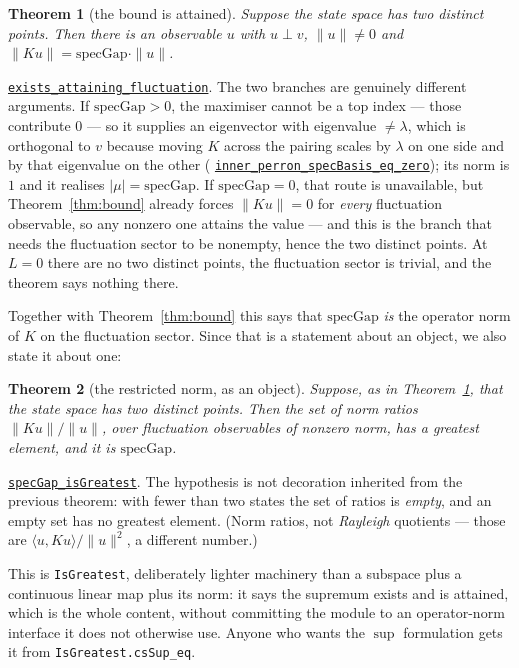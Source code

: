 \documentclass[11pt]{article}
\newtheorem{theorem}{Theorem}[section]
\theoremstyle{definition}
\newcommand{\anchor}{9704b3f3c0d576bb40c43caa5360fbd64dfa1643}
\newcommand{\osline}[3]{%
  \href{https://github.com/lluiseriksson/THE-ERIKSSON-PROGRAMME/blob/\anchor/YangMills/OS/#1.lean\#L#2}{\nolinkurl{#3}}}
\begin{document}
\begin{theorem}[the bound is attained]\label{thm:sharp}
Suppose the state space has two distinct points.  Then there is an observable
$u$ with $u \perp v$, $\|u\| \ne 0$ and
$\|Ku\| = \mathrm{specGap}\cdot\|u\|$.
\end{theorem}

\osline{SpatialSpectral}{886}{exists\_attaining\_fluctuation}.
The two branches are genuinely different arguments.  If
$\mathrm{specGap}>0$, the maximiser cannot be a top index --- those contribute
$0$ --- so it supplies an eigenvector with eigenvalue $\ne\lambda$, which is
orthogonal to $v$ because moving $K$ across the pairing scales by $\lambda$ on
one side and by that eigenvalue on the other
(\osline{SpatialSpectral}{851}{inner\_perron\_specBasis\_eq\_zero}); its norm
is $1$ and it realises $|\mu| = \mathrm{specGap}$.  If $\mathrm{specGap}=0$,
that route is unavailable, but Theorem~\ref{thm:bound} already forces
$\|Ku\|=0$ for \emph{every} fluctuation observable, so any nonzero one attains
the value --- and this is the branch that needs the fluctuation sector to be
nonempty, hence the two distinct points.  At $L=0$ there are no two distinct
points, the fluctuation sector is trivial, and the theorem says nothing there.

Together with Theorem~\ref{thm:bound} this says that $\mathrm{specGap}$
\emph{is} the operator norm of $K$ on the fluctuation sector.  Since that is a
statement about an object, we also state it about one:

\begin{theorem}[the restricted norm, as an object]\label{thm:isgreatest}
Suppose, as in Theorem~\ref{thm:sharp}, that the state space has two distinct
points.  Then the set of norm ratios $\|Ku\|/\|u\|$, over fluctuation
observables of nonzero norm, has a greatest element, and it is
$\mathrm{specGap}$.
\end{theorem}

\osline{SpatialSpectral}{939}{specGap\_isGreatest}.
The hypothesis is not decoration inherited from the previous theorem: with
fewer than two states the set of ratios is \emph{empty}, and an empty set has
no greatest element.  (Norm ratios, not \emph{Rayleigh} quotients --- those are
$\langle u,Ku\rangle/\|u\|^{2}$, a different number.)

This is \texttt{IsGreatest}, deliberately lighter machinery than a subspace
plus a continuous linear map plus its norm: it says the supremum exists and is
attained, which is the whole content, without committing the module to an
operator-norm interface it does not otherwise use.  Anyone who wants the
$\sup$ formulation gets it from \texttt{IsGreatest.csSup\_eq}.
\end{document}
